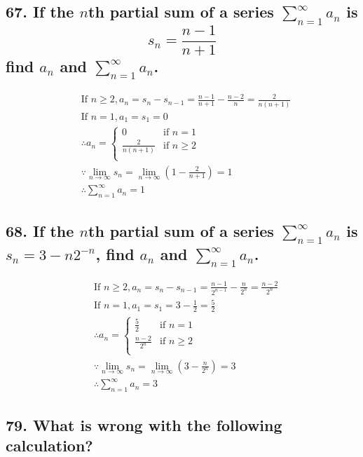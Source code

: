 \documentclass{article}
\begin{document}
    \subsection*{67. If the $n$th partial sum of a series $\sum_{n=1}^\infty a_n$ is $$s_n = \frac{n-1}{n+1}$$find $a_n$ and $\sum_{n=1}^\infty a_n$.}

    $$\begin{aligned}
    &\textrm{If } n \geq 2, a_n = s_n - s_{n-1} = \frac{n-1}{n+1} - \frac{n-2}{n} = \frac{2}{n(n+1)} \\
    &\textrm{If } n = 1, a_1 = s_1 = 0 \\
    &\therefore a_n = \left\{ \begin{array}{ll}
        0 &\textrm{if } n=1 \\
        \frac{2}{n(n+1)} &\textrm {if } n \geq 2 \\
    \end{array}\right. \\
    &\because \lim_{n \to \infty} s_n = \lim_{n \to \infty}(1 - \frac 2 {n+1}) = 1 \\
    &\therefore \sum_{n=1}^\infty a_n = 1
    \end{aligned}$$

    \subsection*{68. If the $n$th partial sum of a series $\sum_{n=1}^\infty a_n$ is $s_n = 3 - n2^{-n}$, find $a_n$ and $\sum_{n=1}^\infty a_n$.}

    $$\begin{aligned}
    &\textrm{If } n \geq 2, a_n = s_n - s_{n-1} = \frac{n-1}{2^{n-1}} - \frac{n}{2^n} = \frac{n-2}{2^n} \\
    &\textrm{If } n = 1, a_1 = s_1 = 3 - \frac 1 2 = \frac 5 2 \\
    &\therefore a_n = \left\{ \begin{array}{ll}
        \frac 5 2 &\textrm{if } n=1 \\
        \frac{n-2}{2^n} &\textrm {if } n \geq 2 \\
    \end{array}\right. \\
    &\because \lim_{n \to \infty} s_n = \lim_{n \to \infty}(3 - \frac{n}{2^n}) = 3 \\
    &\therefore \sum_{n=1}^\infty a_n = 3
    \end{aligned}$$

    \subsection*{79. What is wrong with the following calculation?}
\end{document}
